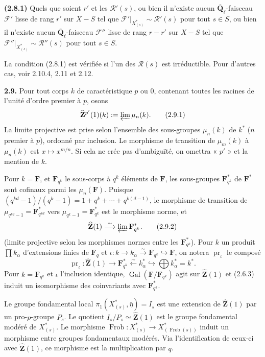 \documentclass[11pt]{article}
\newcommand{\Fq}{\mathbf{F}_q}
\newcommand{\F}{\mathbf{F}}
\newcommand{\Qbl}{\overline{\mathbf{Q}}_{\ell}}
\newcommand{\Gal}{\operatorname{Gal}}
\newcommand{\Frob}{\operatorname{Frob}}
\newcommand{\Zhat}{\widehat{\mathbf{Z}}}
\newcommand{\pr}{\operatorname{pr}}
\newcommand{\Rcal}{\mathcal{R}}
\newcommand{\Fcal}{\mathcal{F}}
\newcommand{\para}[1]{\medskip\noindent\textbf{#1}\enspace}
\begin{document}
\para{(2.8.1)} Quels que soient \(r'\) et les \(\Rcal'(s)\), ou bien il n'existe aucun \(\Qbl\)-faisceau \(\Fcal'\) lisse de rang \(r'\) sur \(X-S\) tel que \(\Fcal'|_{X^*_{(s)}}\sim \Rcal'(s)\) pour tout \(s\in S\), ou bien il n'existe aucun \(\Qbl\)-faisceau \(\Fcal''\) lisse de rang \(r-r'\) sur \(X-S\) tel que \(\Fcal''|_{X^*_{(s)}}\sim \Rcal''(s)\) pour tout \(s\in S\).

La condition (2.8.1) est vérifiée si l'un des \(\Rcal(s)\) est irréductible. Pour d'autres cas, voir 2.10.4, 2.11 et 2.12.

\para{2.9.} Pour tout corps \(k\) de caractéristique \(p\) ou \(0\), contenant toutes les racines de l'unité d'ordre premier à \(p\), osons
\begin{equation}
\Zhat^{p'}(1)(k):=\varprojlim \mu_n(k).
\tag{2.9.1}
\end{equation}
La limite projective est prise selon l'ensemble des sous-groupes \(\mu_n(k)\) de \(k^*\) (\(n\) premier à \(p\)), ordonné par inclusion. Le morphisme de transition de \(\mu_m(k)\) à \(\mu_n(k)\) est \(x\mapsto x^{m/n}\). Si cela ne crée pas d'ambiguïté, on omettra « \(p'\) » et la mention de \(k\).

Pour \(k=\F\), et \(\F_{q^k}\) le sous-corps à \(q^k\) éléments de \(\F\), les sous-groupes \(\F_{q^k}^*\) de \(\F^*\) sont cofinaux parmi les \(\mu_n(\F)\). Puisque \((q^{kd}-1)/(q^k-1)=1+q^k+\cdots+q^{k(d-1)}\), le morphisme de transition de \(\mu_{q^{kd}-1}=\F_{q^{kd}}^*\) vers \(\mu_{q^k-1}=\F_{q^k}^*\) est le morphisme norme, et
\begin{equation}
\Zhat(1)\overset{\sim}{\longrightarrow}\varprojlim \F_{q^k}^*.
\tag{2.9.2}
\end{equation}
(limite projective selon les morphismes normes entre les \(\F_{q^k}^*\)). Pour \(k\) un produit \(\prod k_\alpha\) d'extensions finies de \(\Fq\) et \(\iota:k\to k_\alpha\overset{\sim}{\to}\F_{q^k}\hookrightarrow\F\), on notera \(\pr_\iota\) le composé
\begin{equation}
\pr_\iota:\Zhat(1)\longrightarrow \F_{q^k}^*\overset{\sim}{\longleftarrow}k_\alpha^*\hookrightarrow \bigoplus k_\alpha^*=k^*.
\tag{2.9.3}
\end{equation}
Pour \(k=\F_{q^k}\) et \(\iota\) l'inclusion identique, \(\Gal(\F/\F_{q^k})\) agit sur \(\Zhat(1)\) et (2.6.3) induit un isomorphisme des coinvariants avec \(\F_{q^k}^*\).

Le groupe fondamental local \(\pi_1(X^*_{(s)},\bar\eta)=I_s\) est une extension de \(\Zhat(1)\) par un pro-\(p\)-groupe \(P_s\). Le quotient \(I_s/P_s\simeq\Zhat(1)\) est le groupe fondamental modéré de \(X^*_{(s)}\). Le morphisme \(\Frob:X^*_{(s)}\to X^*_{(\Frob(s))}\) induit un morphisme entre groupes fondamentaux modérés. Via l'identification de ceux-ci avec \(\Zhat(1)\), ce morphisme est la multiplication par \(q\).
\end{document}
